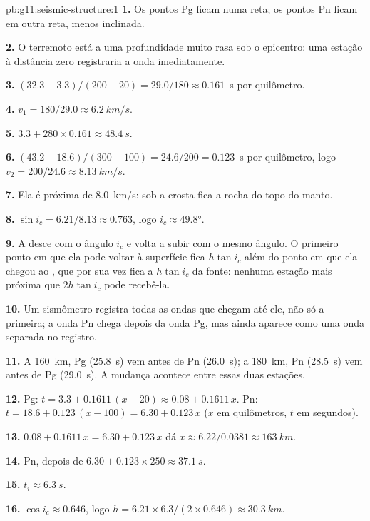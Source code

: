 \begin{solution}{pb:g11:seismic-structure:1}
\textbf{1.} Os pontos Pg ficam numa reta; os pontos Pn ficam em outra reta,
menos inclinada.

\textbf{2.} O terremoto está a uma profundidade muito rasa sob o
epicentro: uma estação à distância zero registraria a onda imediatamente.

\textbf{3.} $(32.3 - 3.3)/(200 - 20) = 29.0/180 \approx \num{0.161}$~\unit{s}
por quilômetro.

\textbf{4.} $v_1 = 180/29.0 \approx \qty{6.2}{km/s}$.

\textbf{5.} $3.3 + 280 \times 0.161 \approx \qty{48.4}{s}$.

\textbf{6.} $(43.2 - 18.6)/(300 - 100) = 24.6/200 = \num{0.123}$~\unit{s}
por quilômetro, logo $v_2 = 200/24.6 \approx \qty{8.13}{km/s}$.

\textbf{7.} Ela é próxima de \qty{8.0}{km/s}: sob a crosta fica a rocha do
topo do manto.

\textbf{8.} $\sin i_c = 6.21/8.13 \approx 0.763$, logo $i_c \approx
\ang{49.8}$.

\textbf{9.} A  desce com o ângulo $i_c$ e volta a subir com o
mesmo ângulo. O primeiro ponto em que ela pode voltar à superfície fica
$h\tan i_c$ além do ponto em que ela chegou ao , que por sua vez fica a
$h\tan i_c$ da fonte: nenhuma estação mais próxima que $2h\tan i_c$ pode
recebê-la.

\textbf{10.} Um sismômetro registra todas as ondas que chegam até ele, não
só a primeira; a onda Pn chega depois da onda Pg, mas ainda aparece como uma
onda separada no registro.

\textbf{11.} A \qty{160}{km}, Pg (\qty{25.8}{s}) vem antes de Pn
(\qty{26.0}{s}); a \qty{180}{km}, Pn (\qty{28.5}{s}) vem antes de Pg
(\qty{29.0}{s}). A mudança acontece entre essas duas estações.

\textbf{12.} Pg: $t = 3.3 + 0.1611\,(x - 20) \approx 0.08 + 0.1611\,x$. Pn:
$t = 18.6 + 0.123\,(x - 100) = 6.30 + 0.123\,x$ ($x$ em quilômetros, $t$ em
segundos).

\textbf{13.} $0.08 + 0.1611\,x = 6.30 + 0.123\,x$ dá $x \approx
6.22/0.0381 \approx \qty{163}{km}$.

\textbf{14.} Pn, depois de $6.30 + 0.123 \times 250 \approx \qty{37.1}{s}$.

\textbf{15.} $t_i \approx \qty{6.3}{s}$.

\textbf{16.} $\cos i_c \approx 0.646$, logo $h = 6.21 \times 6.3/(2 \times
0.646) \approx \qty{30.3}{km}$.


\end{solution}
